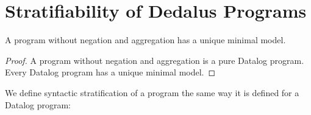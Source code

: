 
\section{Stratifiability of Dedalus Programs}




\begin{lemma} 
%
A \slang program without negation and aggregation has a unique
minimal model.
%
\end{lemma}

\begin{proof} 
%
A \slang program without negation and aggregation is a pure Datalog
program.  Every Datalog program has a unique minimal model. 
%
\end{proof}



We define syntactic stratification of a \slang program the same way it is
defined for a Datalog program:

